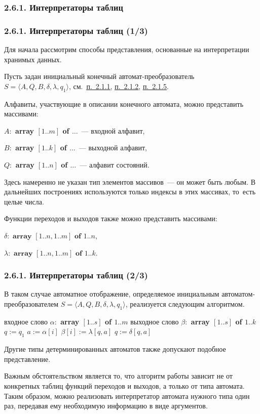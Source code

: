 \documentclass[mathserif,12pt,aspectratio=169]{beamer}
\def\DMref#1#2{{\color{blue}\underline{\hyperlink{#2}{#1}}}}
\begin{document}
\subsubsection{2.6.1. Интерпретаторы таблиц}\label{2.6.1.}
\begin{frame}
\frametitle{2.6.1. Интерпретаторы таблиц (1/3)}


Для начала рассмотрим способы представления,
основанные на интерпретации хранимых данных.

Пусть задан инициальный конечный автомат-преобразователь $S=\langle A, Q, B, \delta,\lambda, q_1
\rangle$, см.~\DMref{п.~2.1.1}{2.1.1.}, \DMref{п.~2.1.2}{2.1.2.}, \DMref{п.~2.1.5}{2.1.5.}.

\medskip
Алфавиты, участвующие в описании конечного автомата, можно
представить массивами:

\textbf{$A:$ array $[1..m]$ of $\ldots$}~--- входной алфавит,

\textbf{$B:$ array $[1..k]$ of $\ldots$}~--- выходной алфавит,

\textbf{$Q:$ array $[1..n]$ of $\ldots$}~--- алфавит состояний.

\begin{remark}
Здесь намеренно не указан тип элементов массивов~--- он может быть
любым. В дальнейших построениях используются только индексы в этих
массивах, то~есть целые числа. 
\end{remark}

\medskip
Функции переходов и выходов
также можно представить массивами:

$  \delta: {\textbf { array }} [1.. n, 1.. m] \textbf{ of } 1..n $,

$ \lambda: {\textbf { array }} [1.. n, 1.. m] \textbf{ of } 1..k$.
\end{frame}

\begin{frame}
\frametitle{2.6.1. Интерпретаторы таблиц (2/3)}
В таком случае автоматное отображение, определяемое инициальным
автоматом-преоб\-разователем $S=\langle A, Q, B, \delta,\lambda, q_1
\rangle$, реализуется следующим алгоритмом.
\begin{algorithmic}
\REQUIRE входное слово {\textbf {$\alpha:$ array $[1..s]$ of $1..m$}}
\ENSURE выходное слово {\textbf {$\beta:$ array $[1..s]$ of $1..k$}}
\STATE $q:=q_1$ 
 \STATE $a:=\alpha[i]$ 
 \STATE $\beta[i]:=\lambda[q,a]$ 
\STATE $q:=\delta[q,a]$ 
\ENDFOR
\end{algorithmic}

Другие типы детерминированных автоматов также допускают подобное
представление.

\medskip
Важным обстоятельством является то, что алгоритм работы зависит не
от конкретных таблиц функций переходов и выходов, а только
от типа автомата. Таким образом, можно реализовать интерпретатор
автомата нужного типа один раз, передавая ему необходимую информацию
в виде аргументов.

\end{frame}
\end{document}
